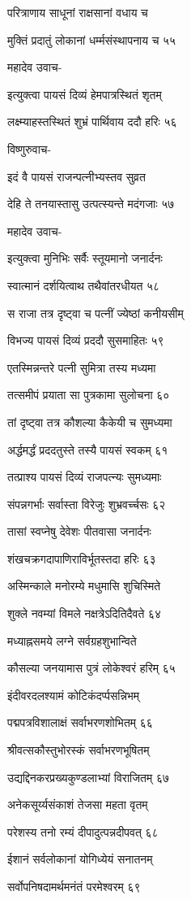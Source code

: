 परित्राणाय साधूनां राक्षसानां वधाय च

मुक्तिं प्रदातुं लोकानां धर्म्मसंस्थापनाय च ५५

महादेव उवाच-

इत्युक्त्वा पायसं दिव्यं हेमपात्रस्थितं शृतम्

लक्ष्म्याहस्तस्थितं शुभ्रं पार्थिवाय ददौ हरिः ५६

विष्णुरुवाच-

इदं वै पायसं राजन्पत्नीभ्यस्तव सुव्रत

देहि ते तनयास्तासु उत्पत्स्यन्ते मदंगजाः ५७

महादेव उवाच-

इत्युक्त्वा मुनिभिः सर्वैः स्तूयमानो जनार्दनः

स्वात्मानं दर्शयित्वाथ तथैवांतरधीयत ५८

स राजा तत्र दृष्ट्वा च पत्नीं ज्येष्ठां कनीयसीम्

विभज्य पायसं दिव्यं प्रददौ सुसमाहितः ५९

एतस्मिन्नन्तरे पत्नी सुमित्रा तस्य मध्यमा

तत्समीपं प्रयाता सा पुत्रकामा सुलोचना ६०

तां दृष्ट्वा तत्र कौशल्या कैकेयी च सुमध्यमा

अर्द्धमर्द्धं प्रददतुस्ते तस्यै पायसं स्वकम् ६१

तत्प्राश्य पायसं दिव्यं राजपत्न्यः सुमध्यमाः

संपन्नगर्भाः सर्वास्ता विरेजुः शुभ्रवर्च्चसः ६२

तासां स्वप्नेषु देवेशः पीतवासा जनार्दनः

शंखचक्रगदापाणिराविर्भूतस्तदा हरिः ६३

अस्मिन्काले मनोरम्ये मधुमासि शुचिस्मिते

शुक्ले नवम्यां विमले नक्षत्रेऽदितिदैवते ६४

मध्याह्नसमये लग्ने सर्वग्रहशुभान्विते

कौसल्या जनयामास पुत्रं लोकेश्वरं हरिम् ६५

इंदीवरदलश्यामं कोटिकंदर्प्पसन्निभम्

पद्मपत्रविशालाक्षं सर्वाभरणशोभितम् ६६

श्रीवत्सकौस्तुभोरस्कं सर्वाभरणभूषितम्

उद्यद्दिनकरप्रख्यकुण्डलाभ्यां विराजितम् ६७

अनेकसूर्य्यसंकाशं तेजसा महता वृतम्

परेशस्य तनो रम्यं दीपादुत्पन्नदीपवत् ६८

ईशानं सर्वलोकानां योगिध्येयं सनातनम्

सर्वोपनिषदामर्थमनंतं परमेश्वरम् ६९

